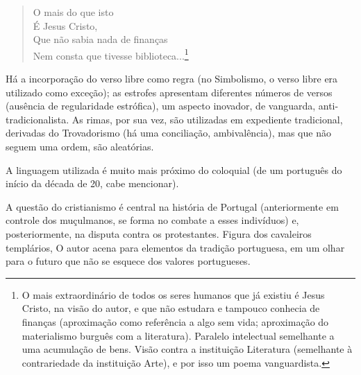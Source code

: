 \begin{verse}
O mais do que isto \\
É Jesus Cristo, \\
Que não sabia nada de finanças \\
Nem consta que tivesse biblioteca...\footnote{O mais extraordinário de todos os seres humanos que já existiu é Jesus Cristo, na visão do autor, e que não estudara e tampouco conhecia de finanças (aproximação como referência a algo sem vida; aproximação do materialismo burguês com a literatura). Paralelo intelectual semelhante a uma acumulação de bens. Visão contra a instituição Literatura (semelhante à contrariedade da instituição Arte), e por isso um poema vanguardista.}
\end{verse}

Há a incorporação do verso libre como regra (no Simbolismo, o verso libre era utilizado como exceção); as estrofes apresentam diferentes números de versos (ausência de regularidade estrófica), um aspecto inovador, de vanguarda, anti-tradicionalista. As rimas, por sua vez, são utilizadas em expediente tradicional, derivadas do Trovadorismo (há uma conciliação, ambivalência), mas que não seguem uma ordem, são aleatórias.

A linguagem utilizada é muito mais próximo do coloquial (de um português do início da década de 20, cabe mencionar).

A questão do cristianismo é central na história de Portugal (anteriormente em controle dos muçulmanos, se forma no combate a esses indivíduos) e, posteriormente, na disputa contra os protestantes. Figura dos cavaleiros templários, O autor acena para elementos da tradição portuguesa, em um olhar para o futuro que não se esquece dos valores portugueses.


